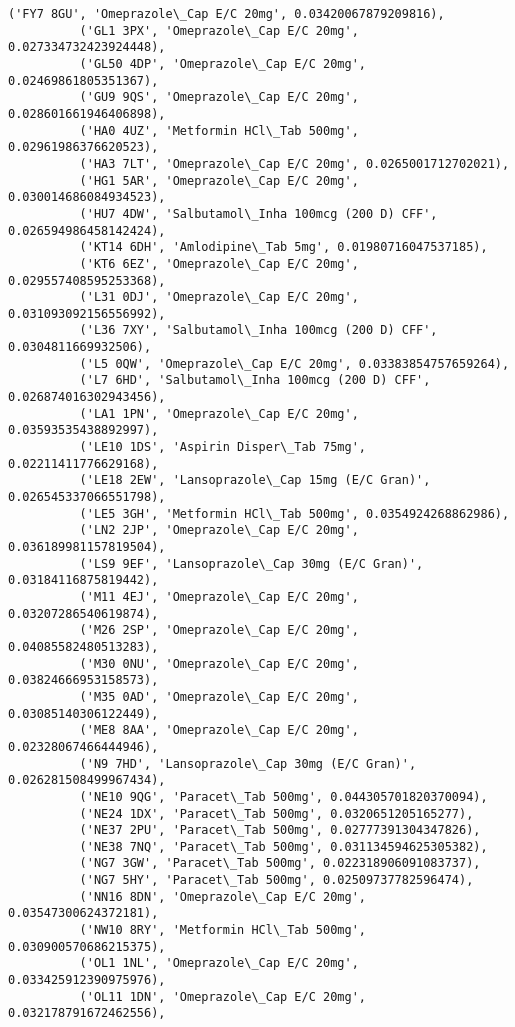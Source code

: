 \documentclass[11pt]{article}
\begin{document}
\begin{Verbatim}[commandchars=\\\{\}]
          ('FY7 8GU', 'Omeprazole\_Cap E/C 20mg', 0.03420067879209816),
          ('GL1 3PX', 'Omeprazole\_Cap E/C 20mg', 0.027334732423924448),
          ('GL50 4DP', 'Omeprazole\_Cap E/C 20mg', 0.02469861805351367),
          ('GU9 9QS', 'Omeprazole\_Cap E/C 20mg', 0.028601661946406898),
          ('HA0 4UZ', 'Metformin HCl\_Tab 500mg', 0.02961986376620523),
          ('HA3 7LT', 'Omeprazole\_Cap E/C 20mg', 0.0265001712702021),
          ('HG1 5AR', 'Omeprazole\_Cap E/C 20mg', 0.030014686084934523),
          ('HU7 4DW', 'Salbutamol\_Inha 100mcg (200 D) CFF', 0.026594986458142424),
          ('KT14 6DH', 'Amlodipine\_Tab 5mg', 0.01980716047537185),
          ('KT6 6EZ', 'Omeprazole\_Cap E/C 20mg', 0.029557408595253368),
          ('L31 0DJ', 'Omeprazole\_Cap E/C 20mg', 0.031093092156556992),
          ('L36 7XY', 'Salbutamol\_Inha 100mcg (200 D) CFF', 0.0304811669932506),
          ('L5 0QW', 'Omeprazole\_Cap E/C 20mg', 0.03383854757659264),
          ('L7 6HD', 'Salbutamol\_Inha 100mcg (200 D) CFF', 0.026874016302943456),
          ('LA1 1PN', 'Omeprazole\_Cap E/C 20mg', 0.03593535438892997),
          ('LE10 1DS', 'Aspirin Disper\_Tab 75mg', 0.02211411776629168),
          ('LE18 2EW', 'Lansoprazole\_Cap 15mg (E/C Gran)', 0.026545337066551798),
          ('LE5 3GH', 'Metformin HCl\_Tab 500mg', 0.0354924268862986),
          ('LN2 2JP', 'Omeprazole\_Cap E/C 20mg', 0.036189981157819504),
          ('LS9 9EF', 'Lansoprazole\_Cap 30mg (E/C Gran)', 0.03184116875819442),
          ('M11 4EJ', 'Omeprazole\_Cap E/C 20mg', 0.03207286540619874),
          ('M26 2SP', 'Omeprazole\_Cap E/C 20mg', 0.04085582480513283),
          ('M30 0NU', 'Omeprazole\_Cap E/C 20mg', 0.03824666953158573),
          ('M35 0AD', 'Omeprazole\_Cap E/C 20mg', 0.03085140306122449),
          ('ME8 8AA', 'Omeprazole\_Cap E/C 20mg', 0.02328067466444946),
          ('N9 7HD', 'Lansoprazole\_Cap 30mg (E/C Gran)', 0.026281508499967434),
          ('NE10 9QG', 'Paracet\_Tab 500mg', 0.044305701820370094),
          ('NE24 1DX', 'Paracet\_Tab 500mg', 0.0320651205165277),
          ('NE37 2PU', 'Paracet\_Tab 500mg', 0.02777391304347826),
          ('NE38 7NQ', 'Paracet\_Tab 500mg', 0.031134594625305382),
          ('NG7 3GW', 'Paracet\_Tab 500mg', 0.022318906091083737),
          ('NG7 5HY', 'Paracet\_Tab 500mg', 0.02509737782596474),
          ('NN16 8DN', 'Omeprazole\_Cap E/C 20mg', 0.03547300624372181),
          ('NW10 8RY', 'Metformin HCl\_Tab 500mg', 0.030900570686215375),
          ('OL1 1NL', 'Omeprazole\_Cap E/C 20mg', 0.033425912390975976),
          ('OL11 1DN', 'Omeprazole\_Cap E/C 20mg', 0.032178791672462556),

\end{Verbatim}
\end{document}
